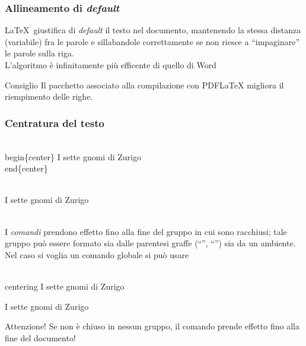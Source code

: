 \documentclass[svgnames,%
	ucs,%
	pdftex]{guitbeamer}
\begin{document}
\begin{frame}
  \frametitle{Allineamento di \textit{default}}
	\LaTeX\ giustifica di \textit{default} il testo nel documento,
	mantenendo la stessa distanza (variabile) fra le parole e
	sillabandole correttamente se non riesce a ``impaginare'' le parole
	sulla riga.\\
  \medskip
	L'algoritmo \`e infinitamente pi\`u efficente di quello di Word
\vfill
	\begin{block}{Consiglio}
		Il pacchetto  associato alla compilazione con PDF\LaTeX{} migliora il riempimento delle righe.
	\end{block}
\end{frame}
\begin{frame}
  \frametitle{Centratura del testo}
	\begin{LaTeXcode}
		\alert{\\begin\{center\}}\n
		\hspace*{5ex}I sette gnomi di Zurigo\n
		\alert{\\end\{center\}}
	\end{LaTeXcode}
	\begin{LaTeXoutput}
		\begin{center}
		\ \\
		I sette gnomi di Zurigo\\[-1ex]
		\
		\end{center}
	\end{LaTeXoutput}
\end{frame}
\begin{frame}
	I \emph{comandi} prendono effetto fino alla fine del gruppo
	in cui sono racchiusi; tale gruppo pu\`o essere formato sia dalle
	parentesi graffe (``\tlb'', ``\trb'') sia da un ambiente.\\
  \medskip
  \onslide<2->
	Nel caso si voglia un comando globale si pu\`o usare \LCmd{centering}
	\begin{LaTeXcode}
		\alert{\\centering}\n
		\hspace*{5ex}I sette gnomi di Zurigo
	\end{LaTeXcode}
	\begin{LaTeXoutput}
		\centering
		I sette gnomi di Zurigo
	\end{LaTeXoutput}
	\begin{block}{Attenzione!}
		Se non \`e chiuso in nessun gruppo, il comando prende effetto fino
		alla fine del documento!
	\end{block}
\end{frame}
\end{document}
